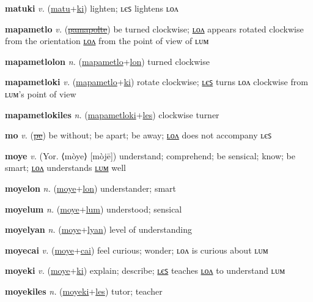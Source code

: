 \textbf{\hypertarget{matuki}{matuki}} \textit{v.} (\hyperlink{matu}{matu}+\allowbreak \hyperlink{ki}{ki})
lighten; ʟєꜱ lightens ʟᴏᴧ

\textbf{\hypertarget{mapametlo}{mapametlo}} \textit{v.} (\hyperlink{pamapolte}{\sout{pamapolte}})
be turned clockwise; \hyperlink{mapametlolon}{ʟᴏᴧ} appears rotated clockwise from the orientation \hyperlink{mapametlolon}{ʟᴏᴧ} from the point of view of ʟᴜᴍ

\textbf{\hypertarget{mapametlolon}{mapametlolon}} \textit{n.} (\hyperlink{mapametlo}{mapametlo}+\allowbreak \hyperlink{lon}{lon})
turned clockwise

\textbf{\hypertarget{mapametloki}{mapametloki}} \textit{v.} (\hyperlink{mapametlo}{mapametlo}+\allowbreak \hyperlink{ki}{ki})
rotate clockwise; \hyperlink{mapametlokiles}{ʟєꜱ} turns ʟᴏᴧ clockwise from ʟᴜᴍ’s point of view

\textbf{\hypertarget{mapametlokiles}{mapametlokiles}} \textit{n.} (\hyperlink{mapametloki}{mapametloki}+\allowbreak \hyperlink{les}{les})
clockwise turner

\textbf{\hypertarget{mo}{mo}} \textit{v.} (\hyperlink{pe}{\sout{pe}})
be without; be apart; be away; \hyperlink{molon}{ʟᴏᴧ} does not accompany ʟєꜱ

\textbf{\hypertarget{moye}{moye}} \textit{v.} (Yor. ⟨mòye⟩ [mòjē])
understand; comprehend; be sensical; know; be smart; \hyperlink{moyelon}{ʟᴏᴧ} understands \hyperlink{moyelum}{ʟᴜᴍ} well

\textbf{\hypertarget{moyelon}{moyelon}} \textit{n.} (\hyperlink{moye}{moye}+\allowbreak \hyperlink{lon}{lon})
understander; smart

\textbf{\hypertarget{moyelum}{moyelum}} \textit{n.} (\hyperlink{moye}{moye}+\allowbreak \hyperlink{lum}{lum})
understood; sensical

\textbf{\hypertarget{moyelyan}{moyelyan}} \textit{n.} (\hyperlink{moye}{moye}+\allowbreak \hyperlink{lyan}{lyan})
level of understanding

\textbf{\hypertarget{moyecai}{moyecai}} \textit{v.} (\hyperlink{moye}{moye}+\allowbreak \hyperlink{cai}{cai})
feel curious; wonder; ʟᴏᴧ is curious about ʟᴜᴍ

\textbf{\hypertarget{moyeki}{moyeki}} \textit{v.} (\hyperlink{moye}{moye}+\allowbreak \hyperlink{ki}{ki})
explain; describe; \hyperlink{moyekiles}{ʟєꜱ} teaches \hyperlink{moyekilon}{ʟᴏᴧ} to understand ʟᴜᴍ

\textbf{\hypertarget{moyekiles}{moyekiles}} \textit{n.} (\hyperlink{moyeki}{moyeki}+\allowbreak \hyperlink{les}{les})
tutor; teacher

